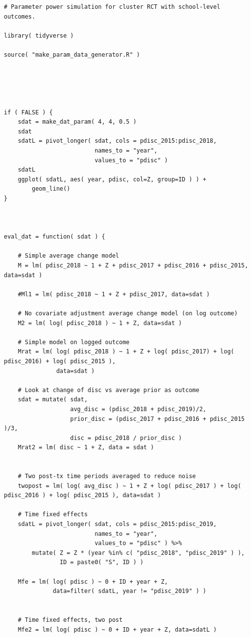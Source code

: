 \documentclass[
]{book}
\begin{document}
\begin{verbatim}
# Parameter power simulation for cluster RCT with school-level outcomes.

library( tidyverse )

source( "make_param_data_generator.R" )





if ( FALSE ) {
    sdat = make_dat_param( 4, 4, 0.5 )
    sdat
    sdatL = pivot_longer( sdat, cols = pdisc_2015:pdisc_2018, 
                          names_to = "year",
                          values_to = "pdisc" )
    sdatL
    ggplot( sdatL, aes( year, pdisc, col=Z, group=ID ) ) +
        geom_line()
}



eval_dat = function( sdat ) {
    
    # Simple average change model
    M = lm( pdisc_2018 ~ 1 + Z + pdisc_2017 + pdisc_2016 + pdisc_2015, data=sdat )
    
    #Ml1 = lm( pdisc_2018 ~ 1 + Z + pdisc_2017, data=sdat )
    
    # No covariate adjustment average change model (on log outcome)
    M2 = lm( log( pdisc_2018 ) ~ 1 + Z, data=sdat )

    # Simple model on logged outcome
    Mrat = lm( log( pdisc_2018 ) ~ 1 + Z + log( pdisc_2017) + log( pdisc_2016) + log( pdisc_2015 ),
               data=sdat )
    
    # Look at change of disc vs average prior as outcome
    sdat = mutate( sdat,
                   avg_disc = (pdisc_2018 + pdisc_2019)/2,
                   prior_disc = (pdisc_2017 + pdisc_2016 + pdisc_2015 )/3,
                   disc = pdisc_2018 / prior_disc )
    Mrat2 = lm( disc ~ 1 + Z, data = sdat )
    
    
    # Two post-tx time periods averaged to reduce noise
    twopost = lm( log( avg_disc ) ~ 1 + Z + log( pdisc_2017 ) + log( pdisc_2016 ) + log( pdisc_2015 ), data=sdat )

    # Time fixed effects
    sdatL = pivot_longer( sdat, cols = pdisc_2015:pdisc_2019, 
                          names_to = "year",
                          values_to = "pdisc" ) %>%
        mutate( Z = Z * (year %in% c( "pdisc_2018", "pdisc_2019" ) ),
                ID = paste0( "S", ID ) )
    
    Mfe = lm( log( pdisc ) ~ 0 + ID + year + Z, 
              data=filter( sdatL, year != "pdisc_2019" ) )
    
    
    # Time fixed effects, two post
    Mfe2 = lm( log( pdisc ) ~ 0 + ID + year + Z, data=sdatL )
        

\end{verbatim}
\end{document}

